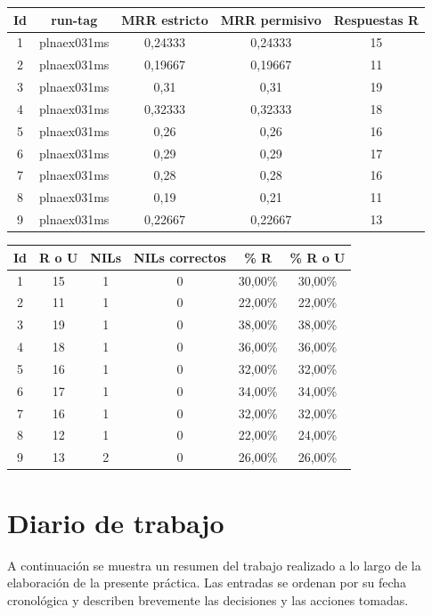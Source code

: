 \documentclass[12pt,a4paper,titlepage]{article}
\begin{document}
\begin{table}[h!]
\begin{center}
\begin{tabular}{|c|c|c|c|c|}
\hline
Id & run-tag & MRR estricto & MRR permisivo & Respuestas R\\ \hline
1 & plnaex031ms & 0,24333 & 0,24333 & 15\\ \hline
2 & plnaex031ms & 0,19667 & 0,19667 & 11\\ \hline
3 & plnaex031ms & 0,31 & 0,31 & 19\\ \hline
4 & plnaex031ms & 0,32333 & 0,32333 & 18\\ \hline
5 & plnaex031ms & 0,26 & 0,26 & 16\\ \hline
6 & plnaex031ms & 0,29 & 0,29 & 17\\ \hline
7 & plnaex031ms & 0,28 & 0,28 & 16\\ \hline
8 & plnaex031ms & 0,19 & 0,21 & 11 \\ \hline
9 & plnaex031ms & 0,22667 & 0,22667 & 13\\ \hline
\end{tabular}
\end{center}
\end{table}

\begin{table}[h!]
\begin{center}
\begin{tabular}{|c|c|c|c|c|c|}
\hline
Id & R o U & NILs & NILs correctos & \% R & \% R o U\\ \hline
1 & 15 & 1 & 0 & 30,00\% & 30,00\% \\ \hline
2 & 11 & 1 & 0 & 22,00\% & 22,00\% \\ \hline
3 & 19 & 1 & 0 & 38,00\% & 38,00\% \\ \hline
4 & 18 & 1 & 0 & 36,00\% & 36,00\% \\ \hline
5 & 16 & 1 & 0 & 32,00\% & 32,00\% \\ \hline
6 & 17 & 1 & 0 & 34,00\% & 34,00\% \\ \hline
7 & 16 & 1 & 0 & 32,00\% & 32,00\% \\ \hline
8 & 12 & 1 & 0 & 22,00\% & 24,00\% \\ \hline
9 & 13 & 2 & 0 & 26,00\% & 26,00\% \\ \hline
\end{tabular}
\end{center}
\end{table}


\clearpage
\section{Diario de trabajo}
A continuación se muestra un resumen del trabajo realizado a lo largo de la elaboración de la presente práctica. Las entradas se ordenan por su fecha cronológica y describen brevemente las decisiones y las acciones tomadas.
\end{document}
